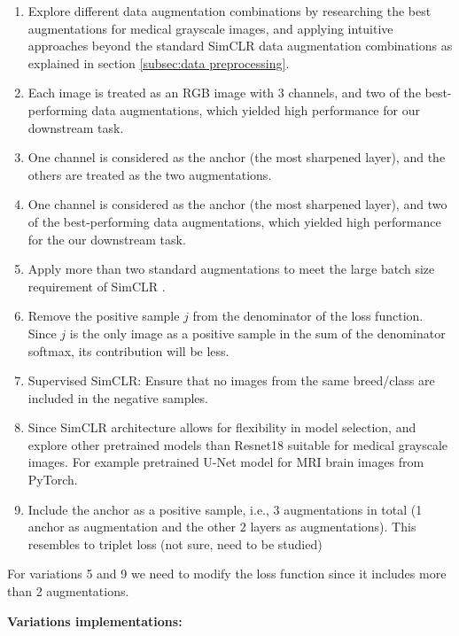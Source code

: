 \documentclass[12pt,twoside,a4paper,parskip]{scrbook} %
\begin{document}
\begin{enumerate}
  \item Explore different data augmentation combinations by researching the best augmentations for medical grayscale images, and applying intuitive approaches beyond the standard SimCLR \cite{chen2020simple} data augmentation combinations as explained in section \ref{subsec:data preprocessing}.
  \item Each image is treated as an RGB image with 3 channels, and two of the best-performing data augmentations, which yielded high performance for our downstream task.

  \item One channel is considered as the anchor (the most sharpened layer), and the others are treated as the two augmentations.
  \item One channel is considered as the anchor (the most sharpened layer), and two of the best-performing data augmentations, which yielded high performance for the our downstream task.

  \item Apply more than two standard augmentations to meet the large batch size requirement of SimCLR \cite{chen2020simple}.

  \item Remove the positive sample \( j \) from the denominator of the loss function. Since \( j \) is the only image as a positive sample in the sum of the denominator softmax, its contribution will be less.

  \item Supervised SimCLR: Ensure that no images from the same breed/class are included in the negative samples.
  \item Since SimCLR architecture \cite{chen2020simple} allows for flexibility in model selection, and explore other pretrained models  than Resnet18  suitable for medical grayscale images. For example pretrained U-Net \cite{ronneberger2015unetconvolutionalnetworksbiomedical} model for MRI brain images from PyTorch.  
  \item Include the anchor as a positive sample, i.e., 3 augmentations in total (1 anchor as augmentation and the other 2 layers as augmentations). This resembles to triplet loss (not sure, need to be studied)  
\end{enumerate}
For variations 5 and 9 we need to modify the loss function since it includes more than 2 augmentations.

\textbf{Variations implementations:}  \label{sec:variations_implementations}
\end{document}
